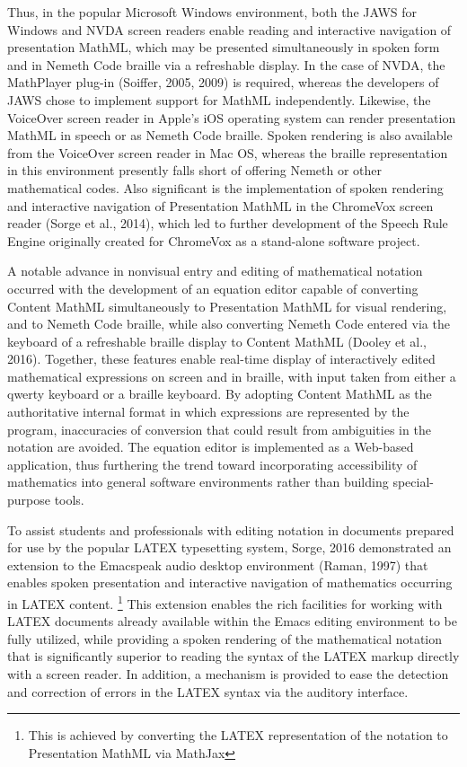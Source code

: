 \documentclass[11.5pt]{sig-alternate} %
\begin{document}
\begin{large}
Thus, in the popular Microsoft Windows environment, both the JAWS for Windows and NVDA screen readers enable reading and interactive navigation of presentation MathML, which may be presented simultaneously in spoken form and in Nemeth Code braille via a refreshable display. In the case of NVDA, the MathPlayer plug-in (Soiffer, 2005, 2009) is required, whereas the developers of JAWS chose to implement support for MathML independently. Likewise, the VoiceOver screen reader in Apple’s iOS operating system can render presentation MathML in speech or as Nemeth Code braille. Spoken rendering is also available from the VoiceOver screen reader in Mac OS, whereas the braille representation in this environment presently falls short of offering Nemeth or other mathematical codes. Also significant is the implementation of spoken rendering and interactive navigation of Presentation MathML in the ChromeVox screen reader (Sorge et al., 2014), which led to further development of the Speech Rule Engine originally created for ChromeVox as a stand-alone software project.

A notable advance in nonvisual entry and editing of mathematical notation occurred with the development of an equation editor capable of converting Content MathML simultaneously to Presentation MathML for visual rendering, and to Nemeth Code braille, while also converting Nemeth Code entered via the keyboard of a refreshable braille display to Content MathML (Dooley et al., 2016). Together, these features enable real-time display of interactively edited mathematical expressions on screen and in braille, with input taken from either a qwerty keyboard or a braille keyboard. By adopting Content MathML as the authoritative internal format in which expressions are represented by the program, inaccuracies of conversion that could result from ambiguities in the notation are avoided. The equation editor is implemented as a Web-based application, thus furthering the trend toward incorporating accessibility of mathematics into general software environments rather than building special-purpose tools.
 
To assist students and professionals with editing notation in documents prepared for use by the popular LATEX typesetting system, Sorge, 2016 demonstrated an extension to the Emacspeak audio desktop environment (Raman, 1997) that enables spoken presentation and interactive navigation of mathematics occurring in LATEX content. \footnote{This is achieved by converting the LATEX representation of the notation to Presentation MathML via MathJax}  This extension enables the rich facilities for working with LATEX documents already available within the Emacs editing environment to be fully utilized, while providing a spoken rendering of the mathematical notation that is significantly superior to reading the syntax of the LATEX markup directly with a screen reader. In addition, a mechanism is provided to ease the detection and correction of errors in the LATEX syntax via the auditory interface.


\end{large}
\end{document}
